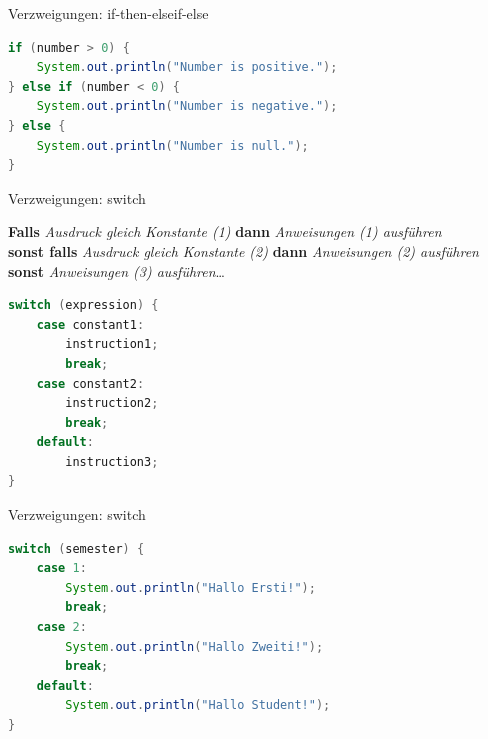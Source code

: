 \documentclass[18pt]{beamer}
\begin{document}
\begin{frame}[fragile]{Verzweigungen: if-then-elseif-else}
    \begin{exampleblock}{}
        \begin{lstlisting}[language=Java]
if (number > 0) {
    System.out.println("Number is positive.");
} else if (number < 0) {
    System.out.println("Number is negative.");
} else {
    System.out.println("Number is null.");
}
        \end{lstlisting}
    \end{exampleblock}
\end{frame}

\begin{frame}[fragile]{Verzweigungen: switch}
    \begin{block}{}
        \textbf{Falls} \textit{Ausdruck gleich Konstante (1)} \textbf{dann} \textit{Anweisungen (1) ausführen}\\
        \textbf{sonst falls} \textit{Ausdruck gleich Konstante (2)} \textbf{dann} \textit{Anweisungen (2) ausführen}\\
        \textbf{sonst} \textit{Anweisungen (3) ausführen}\dots
    \end{block}
    \pause

    \begin{block}{}
        \begin{lstlisting}[language=Java]
switch (expression) {
    case constant1:
        instruction1;
        break;
    case constant2:
        instruction2;
        break;
    default:
        instruction3;
}
        \end{lstlisting}
    \end{block}
\end{frame}

\begin{frame}[fragile]{Verzweigungen: switch}
    \begin{exampleblock}{}
        \begin{lstlisting}[language=Java]
switch (semester) {
    case 1:
        System.out.println("Hallo Ersti!");
        break;
    case 2:
        System.out.println("Hallo Zweiti!");
        break;
    default:
        System.out.println("Hallo Student!");
}
        \end{lstlisting}
    \end{exampleblock}
\end{frame}
\end{document}
